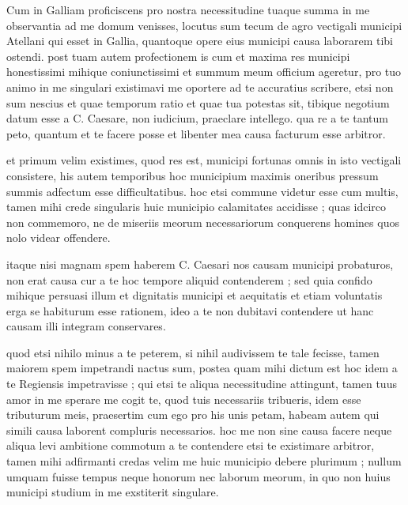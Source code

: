 


 Cum in Galliam proficiscens pro nostra necessitudine tuaque summa in me observantia ad me domum venisses, locutus sum tecum de agro vectigali municipi Atellani qui esset in Gallia, quantoque opere eius municipi causa laborarem tibi ostendi. post tuam autem profectionem is cum et maxima res municipi honestissimi mihique coniunctissimi et summum meum officium ageretur, pro tuo animo in me singulari existimavi me oportere ad te accuratius scribere, etsi non sum nescius et quae temporum ratio et quae tua potestas sit, tibique negotium datum esse a C. Caesare, non iudicium, praeclare intellego. qua re a te tantum peto, quantum et te facere posse et libenter mea causa facturum esse arbitror.

 et primum velim existimes, quod res est, municipi fortunas omnis in isto vectigali consistere, his autem temporibus hoc municipium maximis oneribus pressum summis adfectum esse difficultatibus. hoc etsi commune videtur esse cum multis, tamen mihi crede singularis huic municipio calamitates accidisse ; quas idcirco non commemoro, ne de miseriis meorum necessariorum conquerens homines quos nolo videar offendere.

 itaque nisi magnam spem haberem C. Caesari nos causam municipi probaturos, non erat causa cur a te hoc tempore aliquid contenderem ; sed quia confido mihique persuasi illum et dignitatis municipi et aequitatis et etiam voluntatis erga se habiturum esse rationem, ideo a te non dubitavi contendere ut hanc causam illi integram conservares.

 quod etsi nihilo minus a te peterem, si nihil audivissem te tale fecisse, tamen maiorem spem impetrandi nactus sum, postea quam mihi dictum est hoc idem a te Regiensis impetravisse ; qui etsi te aliqua necessitudine attingunt, tamen tuus amor in me sperare me cogit te, quod tuis necessariis tribueris, idem esse tributurum meis, praesertim cum ego pro his unis petam, habeam autem qui simili causa laborent compluris necessarios. hoc me non sine causa facere neque aliqua levi ambitione commotum a te contendere etsi te existimare arbitror, tamen mihi adfirmanti credas velim me huic municipio debere plurimum ; nullum umquam fuisse tempus neque honorum nec laborum meorum, in quo non huius municipi studium in me exstiterit singulare.

